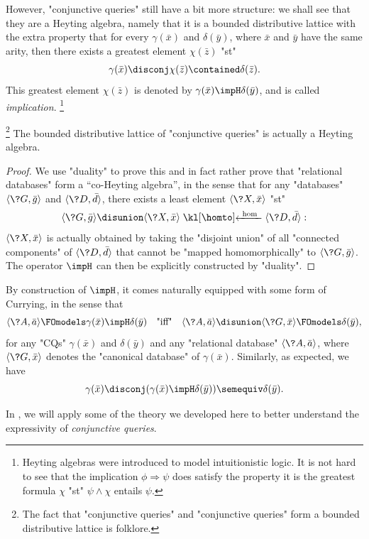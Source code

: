 However, "conjunctive queries" still have a bit more structure: we shall
see that they are a Heyting algebra, namely that it is a bounded distributive lattice
with the extra property that for every $\gamma(\bar x)$ and $\delta(\bar y)$,
where $\bar x$ and $\bar y$ have the same arity, then there exists
a greatest element $\chi(\bar z)$ "st"
\[
	\gamma(\bar x) \disconj \chi(\bar z) \contained \delta(\Bar z). 
\]
This greatest element $\chi(\bar z)$ is denoted by $\gamma(\bar x) \impH \delta(\bar y)$, and is called \emph{implication}.%
\footnote{Heyting algebras were introduced to model intuitionistic logic.
It is not hard to see that the implication $\phi \Rightarrow \psi$
does satisfy the property it is the greatest formula $\chi$
"st" $\psi \land \chi$ entails $\psi$.}

\begin{proposition}
	\!\footnote{The fact that "conjunctive queries" and "conjunctive queries" form
	a bounded distributive lattice is folklore.}
	The bounded distributive lattice of "conjunctive queries" is actually
	a Heyting algebra.
\end{proposition}

\begin{proof}
	We use "duality" to prove this and in fact
	rather prove that "relational databases" form a ``co-Heyting algebra'',
	in the sense that for any "databases" $\tup{\?G, \bar g}$ and $\tup{\?D, \bar d}$,
	there exists a least element $\tup{\?X, \bar x}$ "st"
	\[
		\tup{\?G, \bar g} \disunion \tup{\?X, \bar x} \cohomto \tup{\?D, \bar d}:
	\]
	$\tup{\?X, \bar x}$ is actually obtained by taking the "disjoint union"
	of all "connected components" of $\tup{\?D, \bar d}$ 
	that cannot be "mapped homomorphically" to $\tup{\?G, \bar g}$.
	The operator $\impH$ can then be explicitly constructed by "duality".
\end{proof}

By construction of $\impH$, it comes naturally equipped with some
form of Currying, in the sense that
\[
	\tup{\?A, \bar a}
	\FOmodels \gamma(\bar x) \impH \delta(\bar y)
	\quad\text{"iff"}\quad
	\tup{\?A, \bar a} \disunion \tup{\?G, \bar x}
	\FOmodels \delta(\bar y),
\]
for any "CQs" $\gamma(\bar x)$ and $\delta(\bar y)$
and any "relational database" $\tup{\?A, \bar a}$,
where $\tup{\?G, \bar x}$ denotes the "canonical database" of $\gamma(\bar x)$.
Similarly, as expected, we have
\[
	\gamma(\bar x) \disconj (\gamma(\bar x) \impH \delta(\bar y))
	\semequiv
	\delta(\bar y).
\]

In , we will apply some of the theory we developed here
to better understand the expressivity of \emph{conjunctive queries}.

